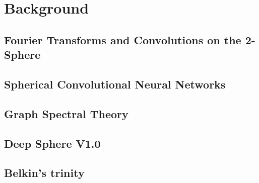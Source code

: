 

\setcounter{page}{1}



\section {Background} 


\subsection{Fourier Transforms and Convolutions on the 2-Sphere}

\subsection{Spherical Convolutional Neural Networks}

\subsection{Graph Spectral Theory}

\subsection{Deep Sphere V1.0}

\subsection{Belkin's trinity}

